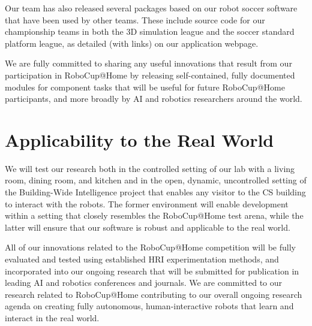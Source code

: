 \documentclass[runningheads,a4paper]{llncs}
\begin{document}
Our team has also released several packages based on our robot soccer
software that have been used by other teams.  These include source code
for our championship teams in both the 3D simulation league and the
soccer standard platform league, as detailed (with links) on our
application webpage.

We are fully committed to sharing any useful innovations that result
from our participation in RoboCup@Home by releasing self-contained,
fully documented modules for component tasks that will be useful for
future RoboCup@Home participants, and more broadly by AI and robotics
researchers around the world.


\section{Applicability to the Real World}

We will test our research both in the controlled setting of our lab
with a living room, dining room, and kitchen and in the open, dynamic,
uncontrolled setting of the Building-Wide Intelligence project that
enables any visitor to the CS building to interact with the robots.
The former environment will enable development within a setting that
closely resembles the RoboCup@Home test arena, while the latter will
ensure that our software is robust and applicable to the real world.

All of our innovations related to the RoboCup@Home competition will
be fully evaluated and tested using established HRI experimentation
methods, and incorporated into our ongoing research that will be
submitted for publication in leading AI and robotics conferences and
journals.  We are committed to our research related to RoboCup@Home
contributing to our overall ongoing research agenda on creating fully
autonomous, human-interactive robots that learn and interact in the
real world.




\newpage

\end{document}
